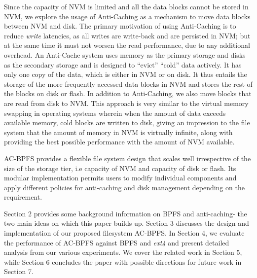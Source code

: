 Since the capacity of NVM is limited and all the data blocks cannot be stored in NVM, we explore the usage of Anti-Caching \cite{c13} as a mechanism to move data blocks between NVM and disk. The primary motivation of using Anti-Caching is to reduce \textit{write} latencies, as all writes are write-back and are persisted in NVM; but at the same time it must not worsen the read performance, due to any additional overhead. An Anti-Cache system uses memory as the primary storage and disks as the secondary storage and is designed to “evict” “cold” data actively. It has only one copy of the data, which is either in NVM or on disk. It thus entails the storage of the more frequently accessed data blocks in NVM and stores the rest of the blocks on disk or flash. In addition to Anti-Caching, we also move blocks that are read from disk to NVM. This approach is very similar to the virtual memory swapping in operating systems wherein when the amount of data exceeds available memory, cold blocks are written to disk, giving an impression to the file system that the amount of memory in NVM is virtually infinite, along with providing the best possible performance with the amount of NVM available.

AC-BPFS provides a flexible file system design that scales well irrespective of the size of the storage tier, i.e capacity of NVM and capacity of disk or flash. Its modular implementation permits users to modify individual components and apply different policies for anti-caching and disk management depending on the requirement.

Section 2 provides some background information on BPFS and anti-caching- the two main ideas on which this paper builds up. Section 3 discusses the design and implementation of our proposed filesystem AC-BPFS. In Section 4, we evaluate the performance of AC-BPFS against BPFS and \textit{ext4} and present detailed analysis from our various experiments. We cover the related work in Section 5, while Section 6 concludes the paper with possible directions for future work in Section 7.
